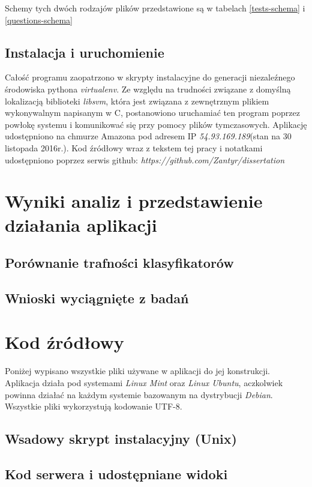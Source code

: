 \documentclass[12pt,a4paper,oneside]{report} %
\begin{document}
Schemy tych dwóch rodzajów plików przedstawione są w tabelach \ref{tests-schema} i \ref{questions-schema}

\section{Instalacja i uruchomienie}

Całość programu zaopatrzono w skrypty instalacyjne do generacji niezaleźnego środowiska pythona \emph{virtualenv}. Ze względu na trudności związane z domyślną lokalizacją biblioteki \emph{libsvm}, która jest związana z zewnętrznym plikiem wykonywalnym napisanym w C, postanowiono uruchamiać ten program poprzez powłokę systemu i komunikować się przy pomocy plików tymczasowych. Aplikację udostępniono na chmurze Amazona pod adresem IP \emph{54.93.169.189}(stan na 30 listopada 2016r.). Kod źródłowy wraz z tekstem tej pracy i notatkami udostępniono poprzez serwis github: \emph{https://github.com/Zantyr/dissertation}\par

\chapter{Wyniki analiz i przedstawienie działania aplikacji}
\section{Porównanie trafności klasyfikatorów}
\section{Wnioski wyciągnięte z badań}





\chapter{Kod źródłowy}
Poniżej wypisano wszystkie pliki używane w aplikacji do jej konstrukcji. Aplikacja działa pod systemami \emph{Linux Mint} oraz \emph{Linux Ubuntu}, aczkolwiek powinna działać na każdym systemie bazowanym na dystrybucji \emph{Debian}. Wszystkie pliki wykorzystują kodowanie UTF-8.
\section{Wsadowy skrypt instalacyjny (Unix)}
%
%
\section{Kod serwera i udostępniane widoki}
%
%
%
%
%
%
%
%
\end{document}
